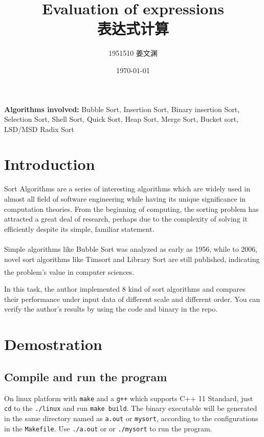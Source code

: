 \documentclass[cn,black,12pt,normal]{elegantnote}
\title{Evaluation of expressions\\表达式计算}
\author{1951510\; 姜文渊}
\institute{\small \url{https://github.com/jwyjohn/Jwy_DataStructureHomework}}
\date{\today}
\newcommand{\uct}[1]{\textsuperscript{\textsuperscript{\cite{#1}}}}
\begin{document}
\maketitle

\textbf{Algorithms involved:} Bubble Sort, Insertion Sort, Binary insertion Sort, Selection Sort, Shell Sort, Quick Sort, Heap Sort, Merge Sort, Bucket sort, LSD/MSD Radix Sort

\tableofcontents

\newpage

\section{Introduction}

Sort Algorithms are a series of interesting algorithms which are widely used in almost all field of software engineering while having its unique significance in computation theories. From the beginning of computing, the sorting problem has attracted a great deal of research, perhaps due to the complexity of solving it efficiently despite its simple, familiar statement.

Simple algorithms like Bubble Sort was analyzed as early as 1956\uct{demuth1957electronic}, while to 2006, novel sort algorithms like Timsort and Library Sort are still published, indicating the problem's value in computer sciences.\uct{auger2015merge}

In this task, the author implemented 8 kind of sort algorithms and compares their performance under input data of different scale and different order. You can verify the author's results by using the code and binary in the repo.

\section{Demostration}

\subsection{Compile and run the program}

On linux platform with \lstinline{make} and a \lstinline{g++} which supports C++ 11 Standard, just \lstinline{cd} to the \lstinline{./linux} and run \lstinline{make build}. The binary executable will be generated in the same directory named as \lstinline{a.out} or \lstinline{mysort}, according to the configurations in the \lstinline{Makefile}. Use \lstinline{./a.out} or or \lstinline{./mysort} to run the program.
\end{document}
